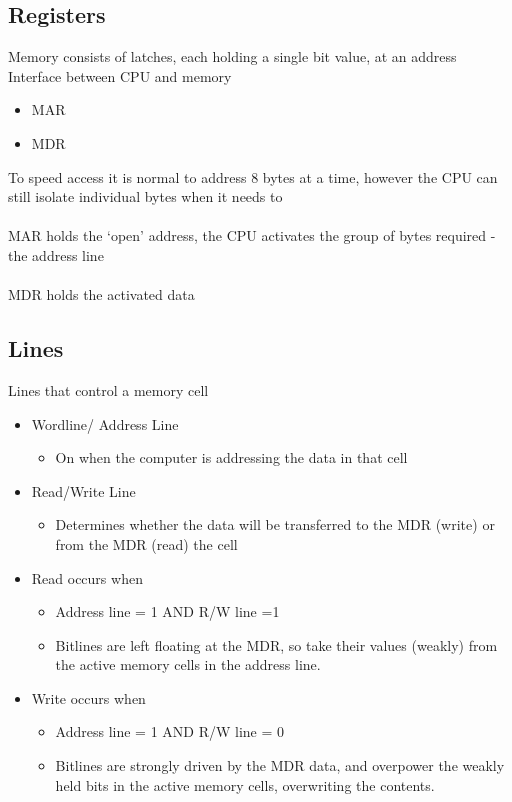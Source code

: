 \documentclass{article}[18pt]
\begin{document}
\subsection{Registers}
Memory consists of latches, each holding a single bit value, at an address\\
Interface between CPU and memory
\begin{itemize}
	\item MAR
	\item MDR
\end{itemize}
To speed access it is normal to address 8 bytes at a time, however the CPU can still isolate individual bytes when it needs to\\
\\
MAR holds the ‘open’ address, the CPU activates the group of bytes required - the address line \\
\\
MDR holds the activated data
\subsection{Lines}
Lines that control a memory cell
\begin{itemize}
	\item Wordline/ Address Line
	\begin{itemize}
		\item On when the computer is addressing the data in that cell
	\end{itemize}
	\item Read/Write Line
	\begin{itemize}
		\item Determines whether the data will be transferred to the MDR (write) or from the MDR (read) the cell 
	\end{itemize}
	\item Read occurs when
	\begin{itemize}
		\item Address line = 1 AND R/W line =1 
		\item Bitlines are left floating at the MDR, so take their values (weakly) from the active memory cells in the address line. 
	\end{itemize}
	\item Write occurs when
	\begin{itemize}
		\item Address line = 1 AND R/W line = 0 
		\item Bitlines are strongly driven by the MDR data, and overpower the weakly held bits in the active memory cells, overwriting the contents.
	\end{itemize}
\end{itemize}
\end{document}
